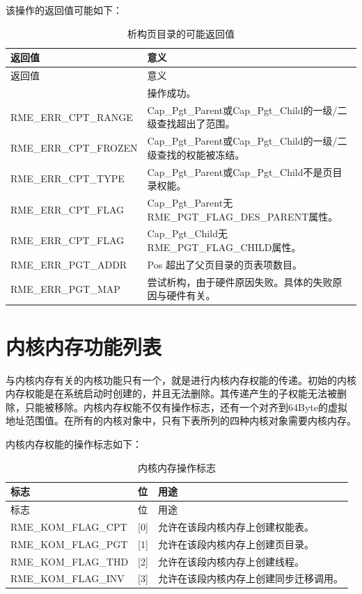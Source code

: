该操作的返回值可能如下：

\begin{xltabular}{\textwidth}{@{}>{\hsize\raggedright\arraybackslash}X>{\hsize\raggedright\arraybackslash}X@{}}
\caption{析构页目录的可能返回值}\label{tab:3-21-destruct-page-directory-return-values}\\
\toprule
返回值 & 意义\tabularnewline
\endfirsthead
\toprule
返回值 & 意义\tabularnewline
\midrule
\endhead
\bottomrule
{} & 操作成功。\tabularnewline
    RME\_ERR\_CPT\_RANGE & Cap\_Pgt\_Parent或Cap\_Pgt\_Child的一级/二级查找超出了范围。\tabularnewline
    RME\_ERR\_CPT\_FROZEN & Cap\_Pgt\_Parent或Cap\_Pgt\_Child的一级/二级查找的权能被冻结。\tabularnewline
    RME\_ERR\_CPT\_TYPE & Cap\_Pgt\_Parent或Cap\_Pgt\_Child不是页目录权能。\tabularnewline
    RME\_ERR\_CPT\_FLAG & Cap\_Pgt\_Parent无RME\_PGT\_FLAG\_DES\_PARENT属性。\tabularnewline
    RME\_ERR\_CPT\_FLAG & Cap\_Pgt\_Child无RME\_PGT\_FLAG\_CHILD属性。\tabularnewline
    RME\_ERR\_PGT\_ADDR & Pos 超出了父页目录的页表项数目。\tabularnewline
    RME\_ERR\_PGT\_MAP & 尝试析构，由于硬件原因失败。具体的失败原因与硬件有关。\tabularnewline
\end{xltabular}

\section{内核内存功能列表}\label{sec:3-kernel-memory-function-list}
\nopagebreak[4]

与内核内存有关的内核功能只有一个，就是进行内核内存权能的传递。初始的内核内存权能是在系统启动时创建的，并且无法删除。其传递产生的子权能无法被删除，只能被移除。内核内存权能不仅有操作标志，还有一个对齐到64Byte的虚拟地址范围值。在所有的内核对象中，只有下表所列的四种内核对象需要内核内存。

内核内存权能的操作标志如下：

\begin{xltabular}{\textwidth}{@{}>{\hsize\raggedright\arraybackslash}X>{\hsize\raggedright\arraybackslash}X>{\hsize\raggedright\arraybackslash}X@{}}
\caption{内核内存操作标志}\label{tab:3-22-kernel-memory-operation-flags}\\
\toprule
标志 & 位 & 用途\tabularnewline
\endfirsthead
\toprule
标志 & 位 & 用途\tabularnewline
\midrule
\endhead
\bottomrule
\endlastfoot
RME\_KOM\_FLAG\_CPT & {[}0{]} &
允许在该段内核内存上创建权能表。\tabularnewline
RME\_KOM\_FLAG\_PGT & {[}1{]} &
允许在该段内核内存上创建页目录。\tabularnewline
RME\_KOM\_FLAG\_THD & {[}2{]} &
允许在该段内核内存上创建线程。\tabularnewline
RME\_KOM\_FLAG\_INV & {[}3{]} &
允许在该段内核内存上创建同步迁移调用。\tabularnewline
\end{xltabular}

